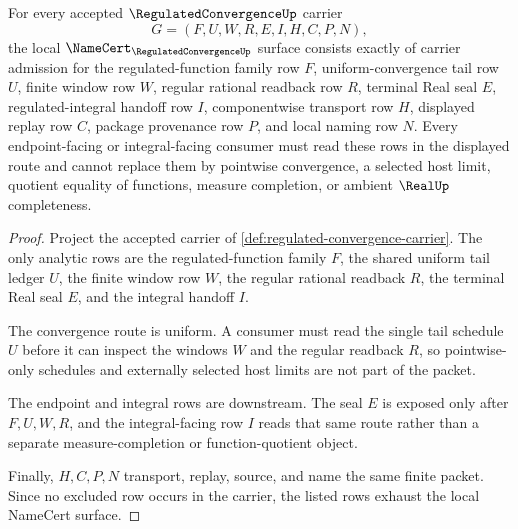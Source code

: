 \begin{theorem}
\label{thm:regulated-convergence-namecert-obligations}
For every accepted $\RegulatedConvergenceUp$ carrier
$$
G=(F,U,W,R,E,I,H,C,P,N),
$$
the local $\NameCert_{\RegulatedConvergenceUp}$ surface consists exactly of carrier admission for the regulated-function family row $F$, uniform-convergence tail row $U$, finite window row $W$, regular rational readback row $R$, terminal Real seal $E$, regulated-integral handoff row $I$, componentwise transport row $H$, displayed replay row $C$, package provenance row $P$, and local naming row $N$. Every endpoint-facing or integral-facing consumer must read these rows in the displayed route and cannot replace them by pointwise convergence, a selected host limit, quotient equality of functions, measure completion, or ambient $\RealUp$ completeness.
\end{theorem}
\begin{proof}
Project the accepted carrier of \autoref{def:regulated-convergence-carrier}. The only analytic rows are the regulated-function family $F$, the shared uniform tail ledger $U$, the finite window row $W$, the regular rational readback $R$, the terminal Real seal $E$, and the integral handoff $I$.

The convergence route is uniform. A consumer must read the single tail schedule $U$ before it can inspect the windows $W$ and the regular readback $R$, so pointwise-only schedules and externally selected host limits are not part of the packet.

The endpoint and integral rows are downstream. The seal $E$ is exposed only after $F,U,W,R$, and the integral-facing row $I$ reads that same route rather than a separate measure-completion or function-quotient object.

Finally, $H,C,P,N$ transport, replay, source, and name the same finite packet. Since no excluded row occurs in the carrier, the listed rows exhaust the local NameCert surface.
\end{proof}

